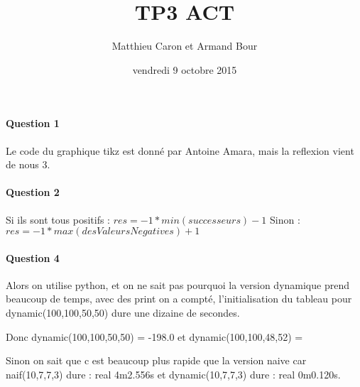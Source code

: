\documentclass[a4paper,10pt]{article}
\title{TP3 ACT}
\author{Matthieu Caron et Armand Bour}
\date{vendredi 9 octobre 2015}
\begin{document}
\maketitle

\paragraph{Question 1}

Le code du graphique tikz est donné par Antoine Amara, mais la reflexion vient de nous 3.



\paragraph{Question 2}
Si ils sont tous positifs : $res = -1 * min(successeurs)-1$\newline
Sinon : $res = -1*max(desValeursNegatives) + 1$

\paragraph{Question 4}
Alors on utilise python, et on ne sait pas pourquoi la version dynamique prend beaucoup de temps,
avec des print on a compté, l'initialisation du tableau pour dynamic(100,100,50,50) dure une dizaine de secondes.

Donc dynamic(100,100,50,50) = -198.0
et dynamic(100,100,48,52) = 

Sinon on sait que c est beaucoup plus rapide que la version naive car naif(10,7,7,3) dure : real 4m2.556s
et dynamic(10,7,7,3) dure : real 0m0.120s.
\end{document}
